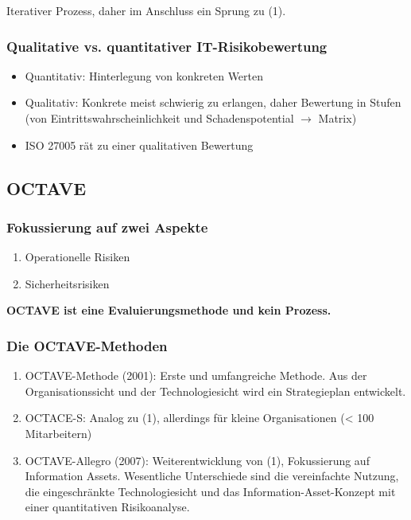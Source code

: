 Iterativer Prozess, daher im Anschluss ein Sprung zu (1).

\subsubsection{Qualitative vs. quantitativer IT-Risikobewertung}
\begin{itemize}
	\item Quantitativ: Hinterlegung von konkreten Werten
	\item Qualitativ: Konkrete meist schwierig zu erlangen, daher Bewertung in Stufen (von Eintrittswahrscheinlichkeit und Schadenspotential $\rightarrow$ Matrix)
	\item ISO 27005 rät zu einer qualitativen Bewertung
\end{itemize}


\subsection{OCTAVE}

\subsubsection{Fokussierung auf zwei Aspekte}
\begin{enumerate}
	\item Operationelle Risiken
	\item Sicherheitsrisiken
\end{enumerate}

\textbf{OCTAVE ist eine Evaluierungsmethode und kein Prozess.}

\subsubsection{Die OCTAVE-Methoden}
\begin{enumerate}
	\item OCTAVE-Methode (2001): Erste und umfangreiche Methode. Aus der Organisationssicht und der Technologiesicht wird ein Strategieplan entwickelt.
	\item OCTACE-S: Analog zu (1), allerdings für kleine Organisationen (< 100 Mitarbeitern)
	\item OCTAVE-Allegro (2007): Weiterentwicklung von (1), Fokussierung auf Information Assets. Wesentliche Unterschiede sind die vereinfachte Nutzung, die eingeschränkte Technologiesicht und das Information-Asset-Konzept mit einer quantitativen Risikoanalyse.
\end{enumerate}

